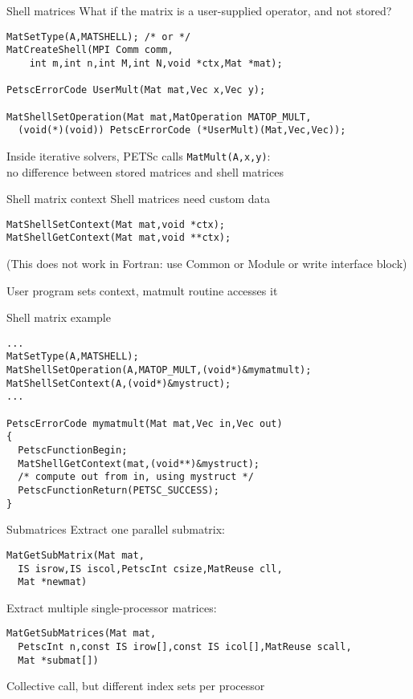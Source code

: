 \begin{numberedframe}{Shell matrices}
What if the matrix is a user-supplied operator, and not stored?

\begin{lstlisting}
MatSetType(A,MATSHELL); /* or */
MatCreateShell(MPI Comm comm,
    int m,int n,int M,int N,void *ctx,Mat *mat);

PetscErrorCode UserMult(Mat mat,Vec x,Vec y);

MatShellSetOperation(Mat mat,MatOperation MATOP_MULT,
  (void(*)(void)) PetscErrorCode (*UserMult)(Mat,Vec,Vec));
\end{lstlisting}
Inside iterative solvers, PETSc calls \lstinline{MatMult(A,x,y)}: \\
no difference between stored matrices and shell matrices
\end{numberedframe}

\begin{numberedframe}{Shell matrix context}
Shell matrices need custom data
\begin{lstlisting}
MatShellSetContext(Mat mat,void *ctx);
MatShellGetContext(Mat mat,void **ctx);
\end{lstlisting}
(This does not work in Fortran: use Common or Module
or write interface block)

User program sets context, matmult routine accesses it
\end{numberedframe}

\begin{numberedframe}{Shell matrix example}
\begin{lstlisting}
...
MatSetType(A,MATSHELL);
MatShellSetOperation(A,MATOP_MULT,(void*)&mymatmult);
MatShellSetContext(A,(void*)&mystruct);
...

PetscErrorCode mymatmult(Mat mat,Vec in,Vec out)
{
  PetscFunctionBegin;
  MatShellGetContext(mat,(void**)&mystruct);
  /* compute out from in, using mystruct */
  PetscFunctionReturn(PETSC_SUCCESS);
}
\end{lstlisting}
\end{numberedframe}


\begin{numberedframe}{Submatrices}
Extract one parallel submatrix:
\begin{lstlisting}
MatGetSubMatrix(Mat mat,
  IS isrow,IS iscol,PetscInt csize,MatReuse cll,
  Mat *newmat)
\end{lstlisting}
Extract multiple single-processor matrices:
{\small
\begin{lstlisting}
MatGetSubMatrices(Mat mat,
  PetscInt n,const IS irow[],const IS icol[],MatReuse scall,
  Mat *submat[])
\end{lstlisting}
}
Collective call, but different index sets per processor
\end{numberedframe}

